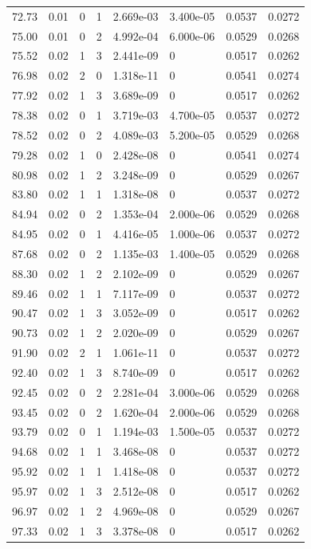 \documentclass[preview]{standalone}
\begin{document}
{{{\begin{tabular}{L{1.2cm}C{1.2cm} C{0.3cm}C{0.5cm} C{1.4cm}C{1.4cm} C{1.4cm}C{1.4cm}}
  72.73  &  0.01  & 0     &  1 &  2.669e-03  & 3.400e-05  & 0.0537 &  0.0272   \\ 
  75.00  &  0.01  & 0     &  2 &  4.992e-04  & 6.000e-06  & 0.0529 &  0.0268   \\ 
  75.52  &  0.02  & 1     &  3 &  2.441e-09  & 0  & 0.0517 &  0.0262   \\ 
  76.98  &  0.02  & 2     &  0 &  1.318e-11  & 0  & 0.0541 &  0.0274   \\ 
  77.92  &  0.02  & 1     &  3 &  3.689e-09  & 0  & 0.0517 &  0.0262   \\ 
  78.38  &  0.02  & 0     &  1 &  3.719e-03  & 4.700e-05  & 0.0537 &  0.0272   \\ 
  78.52  &  0.02  & 0     &  2 &  4.089e-03  & 5.200e-05  & 0.0529 &  0.0268   \\ 
  79.28  &  0.02  & 1     &  0 &  2.428e-08  & 0  & 0.0541 &  0.0274   \\ 
  80.98  &  0.02  & 1     &  2 &  3.248e-09  & 0  & 0.0529 &  0.0267   \\ 
  83.80  &  0.02  & 1     &  1 &  1.318e-08  & 0  & 0.0537 &  0.0272   \\ 
  84.94  &  0.02  & 0     &  2 &  1.353e-04  & 2.000e-06  & 0.0529 &  0.0268   \\ 
  84.95  &  0.02  & 0     &  1 &  4.416e-05  & 1.000e-06  & 0.0537 &  0.0272   \\ 
  87.68  &  0.02  & 0     &  2 &  1.135e-03  & 1.400e-05  & 0.0529 &  0.0268   \\ 
  88.30  &  0.02  & 1     &  2 &  2.102e-09  & 0  & 0.0529 &  0.0267   \\ 
  89.46  &  0.02  & 1     &  1 &  7.117e-09  & 0  & 0.0537 &  0.0272   \\ 
  90.47  &  0.02  & 1     &  3 &  3.052e-09  & 0  & 0.0517 &  0.0262   \\ 
  90.73  &  0.02  & 1     &  2 &  2.020e-09  & 0  & 0.0529 &  0.0267   \\ 
  91.90  &  0.02  & 2     &  1 &  1.061e-11  & 0  & 0.0537 &  0.0272   \\ 
  92.40  &  0.02  & 1     &  3 &  8.740e-09  & 0  & 0.0517 &  0.0262   \\ 
  92.45  &  0.02  & 0     &  2 &  2.281e-04  & 3.000e-06  & 0.0529 &  0.0268   \\ 
  93.45  &  0.02  & 0     &  2 &  1.620e-04  & 2.000e-06  & 0.0529 &  0.0268   \\ 
  93.79  &  0.02  & 0     &  1 &  1.194e-03  & 1.500e-05  & 0.0537 &  0.0272   \\ 
  94.68  &  0.02  & 1     &  1 &  3.468e-08  & 0  & 0.0537 &  0.0272   \\ 
  95.92  &  0.02  & 1     &  1 &  1.418e-08  & 0  & 0.0537 &  0.0272   \\ 
  95.97  &  0.02  & 1     &  3 &  2.512e-08  & 0  & 0.0517 &  0.0262   \\ 
  96.97  &  0.02  & 1     &  2 &  4.969e-08  & 0  & 0.0529 &  0.0267   \\ 
  97.33  &  0.02  & 1     &  3 &  3.378e-08  & 0  & 0.0517 &  0.0262   \\ 
\hline 
\end{tabular} 

}}}
\end{document}
